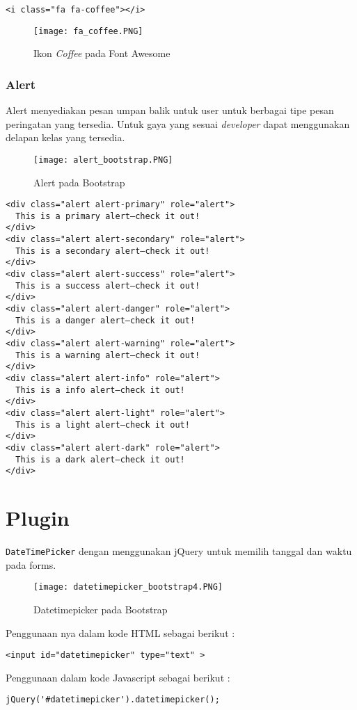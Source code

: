 \begin{lstlisting}[frame=single]
<i class="fa fa-coffee"></i>
\end{lstlisting}

\begin{figure} [H]
	\centering  
	\texttt{[image: fa\_coffee.PNG]}  
	\caption{Ikon \textit{Coffee} pada Font Awesome} 
\end{figure}
\subsubsection{Alert}
Alert menyediakan pesan umpan balik untuk user untuk berbagai tipe pesan peringatan yang tersedia. Untuk gaya yang sesuai \textit{developer} dapat menggunakan delapan kelas yang tersedia.
\begin{figure} [H]
	\centering  
	\texttt{[image: alert\_bootstrap.PNG]}  
	\caption{Alert pada Bootstrap} 
\end{figure}
\begin{lstlisting}[frame=single] 
<div class="alert alert-primary" role="alert">
  This is a primary alert—check it out!
</div>
<div class="alert alert-secondary" role="alert">
  This is a secondary alert—check it out!
</div>
<div class="alert alert-success" role="alert">
  This is a success alert—check it out!
</div>
<div class="alert alert-danger" role="alert">
  This is a danger alert—check it out!
</div>
<div class="alert alert-warning" role="alert">
  This is a warning alert—check it out!
</div>
<div class="alert alert-info" role="alert">
  This is a info alert—check it out!
</div>
<div class="alert alert-light" role="alert">
  This is a light alert—check it out!
</div>
<div class="alert alert-dark" role="alert">
  This is a dark alert—check it out!
</div>
\end{lstlisting}

\section{Plugin}
\texttt{DateTimePicker} dengan menggunakan jQuery untuk memilih tanggal dan waktu pada forms. 
\begin{figure} [H]
	\centering  
	\texttt{[image: datetimepicker\_bootstrap4.PNG]}  
	\caption{Datetimepicker pada Bootstrap} 
\end{figure}
\noindent Penggunaan nya dalam kode HTML sebagai berikut :
\begin{lstlisting}[frame=single] 
<input id="datetimepicker" type="text" >
\end{lstlisting}

\noindent Penggunaan dalam kode Javascript sebagai berikut :
\begin{lstlisting}[frame=single] 
jQuery('#datetimepicker').datetimepicker();
\end{lstlisting}

 

 
